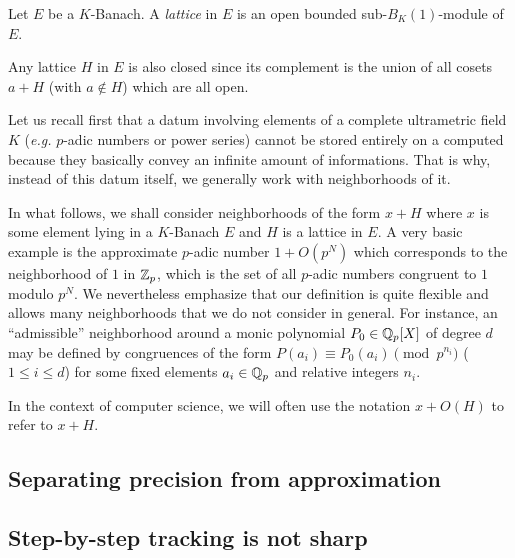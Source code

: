 \documentclass{lms}
\begin{document}
\begin{deftn}
Let $E$ be a $K$-Banach.
A \emph{lattice} in $E$ is an open bounded sub-$B_K(1)$-module of $E$.
\end{deftn}

\begin{rmk}
Any lattice $H$ in $E$ is also closed since its complement is the
union of all cosets $a + H$ (with $a \not\in H$) which are all open.
\end{rmk}






Let us recall first 
that a datum involving elements of a complete ultrametric field $K$ 
(\emph{e.g.} $p$-adic numbers or power series) cannot be stored entirely 
on a computed because they basically convey an infinite amount of 
informations. That is why, instead of this datum itself, we generally 
work with neighborhoods of it.

In what follows, we shall consider neighborhoods of the form $x + H$ 
where $x$ is some element lying in a $K$-Banach $E$ and $H$ is a lattice 
in $E$. A very basic example is the approximate $p$-adic number $1 + 
O(p^N)$ which corresponds to the neighborhood of $1$ in $\mathbb Z_p$, which is 
the set of all $p$-adic numbers congruent to $1$ modulo $p^N$. We 
nevertheless emphasize that our definition is quite flexible and allows 
many neighborhoods that we do not consider in general. For instance, an 
``admissible'' neighborhood around a monic polynomial $P_0 \in \mathbb Q_p[X]$ 
of degree $d$ may be defined by congruences of the form $P(a_i) \equiv 
P_0(a_i) \pmod {p^{n_i}}$ ($1 \leq i \leq d$) for some fixed elements 
$a_i \in \mathbb Q_p$ and relative integers $n_i$.

In the context of computer science, we will often use the notation $x + 
O(H)$ to refer to $x + H$.

\subsection{Separating precision from approximation}




\subsection{Step-by-step tracking is not sharp}
\label{ssec:stepbystep}
\end{document}
